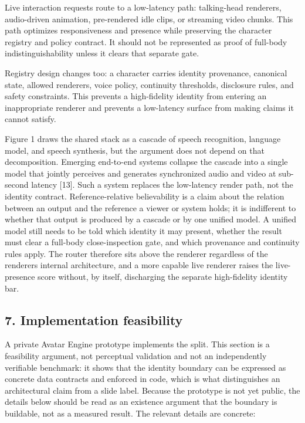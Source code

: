\documentclass[
]{article}
\begin{document}
Live interaction requests route to a low-latency path: talking-head
renderers, audio-driven animation, pre-rendered idle clips, or streaming
video chunks. This path optimizes responsiveness and presence while
preserving the character registry and policy contract. It should not be
represented as proof of full-body indistinguishability unless it clears
that separate gate.

Registry design changes too: a character carries identity provenance,
canonical state, allowed renderers, voice policy, continuity thresholds,
disclosure rules, and safety constraints. This prevents a high-fidelity
identity from entering an inappropriate renderer and prevents a
low-latency surface from making claims it cannot satisfy.

Figure 1 draws the shared stack as a cascade of speech recognition,
language model, and speech synthesis, but the argument does not depend
on that decomposition. Emerging end-to-end systems collapse the cascade
into a single model that jointly perceives and generates synchronized
audio and video at sub-second latency {[}13{]}. Such a system replaces
the low-latency render path, not the identity contract.
Reference-relative believability is a claim about the relation between
an output and the reference a viewer or system holds; it is indifferent
to whether that output is produced by a cascade or by one unified model.
A unified model still needs to be told which identity it may present,
whether the result must clear a full-body close-inspection gate, and
which provenance and continuity rules apply. The router therefore sits
above the renderer regardless of the renderer\textquotesingle s internal
architecture, and a more capable live renderer raises the live-presence
score without, by itself, discharging the separate high-fidelity
identity bar.

\subsection{7. Implementation
feasibility}\label{7-implementation-feasibility}

A private Avatar Engine prototype implements the split. This section is
a feasibility argument, not perceptual validation and not an
independently verifiable benchmark: it shows that the identity boundary
can be expressed as concrete data contracts and enforced in code, which
is what distinguishes an architectural claim from a slide label. Because
the prototype is not yet public, the details below should be read as an
existence argument that the boundary is buildable, not as a measured
result. The relevant details are concrete:
\end{document}
